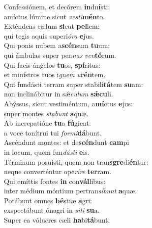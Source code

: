 \evenverse Confessiónem, et decórem \textbf{in}du\textbf{í}sti:~\*\\
\evenverse amíctus lúmine sicut \textit{ve}\textit{sti}\textbf{mén}to.\\
\oddverse Exténdens cælum \textbf{si}cut \textbf{pel}lem:~\*\\
\oddverse qui tegis aquis superi\textit{ó}\textit{ra} \textbf{e}jus.\\
\evenverse Qui ponis nubem a\textbf{scén}sum \textbf{tu}um:~\*\\
\evenverse qui ámbulas super pen\textit{nas} \textit{ven}\textbf{tó}rum.\\
\oddverse Qui facis ángelos \textbf{tu}os, \textbf{spí}ritus:~\*\\
\oddverse et minístros tuos i\textit{gnem} \textit{u}\textbf{rén}tem.\\
\evenverse Qui fundásti terram super stabili\textbf{tá}tem \textbf{su}am:~\*\\
\evenverse non inclinábitur in sǽ\textit{cu}\textit{lum} \textbf{sǽ}\textbf{cu}li.\\
\oddverse Abýssus, sicut vestiméntum, a\textbf{mí}ctus \textbf{e}jus:~\*\\
\oddverse super montes \textit{sta}\textit{bunt} \textbf{a}quæ.\\
\evenverse Ab increpatióne \textbf{tu}a \textbf{fú}gient:~\*\\
\evenverse a voce tonítrui tui \textit{for}\textit{mi}\textbf{dá}bunt.\\
\oddverse Ascéndunt montes: et de\textbf{scén}dunt \textbf{cam}pi~\*\\
\oddverse in locum, quem fun\textit{dá}\textit{sti} \textbf{e}is.\\
\evenverse Términum posuísti, quem non tran\textbf{sgre}di\textbf{én}tur:~\*\\
\evenverse neque converténtur ope\textit{rí}\textit{re} \textbf{ter}ram.\\
\oddverse Qui emíttis fontes \textbf{in} con\textbf{vál}libus:~\*\\
\oddverse inter médium móntium pertran\textit{sí}\textit{bunt} \textbf{a}quæ.\\
\evenverse Potábunt omnes \textbf{bé}stiæ \textbf{a}gri:~\*\\
\evenverse exspectábunt ónagri in \textit{si}\textit{ti} \textbf{su}a.\\
\oddverse Super ea vólucres cæli \textbf{ha}bi\textbf{tá}bunt:~\*\\
